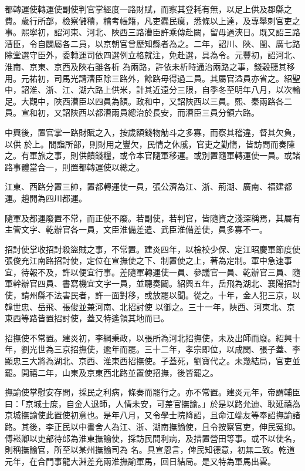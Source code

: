 \begin{pinyinscope}
 都轉運使轉運使副使判官掌經度一路財賦，而察其登耗有無，以足上供及郡縣之費。歲行所部，檢察儲積，稽考帳籍，凡吏蠹民瘼，悉條以上達，及專舉刺官吏之事。熙寧初，詔河東、河北、陜西三路漕臣許乘傳赴闕，留毋過浹日。既又詔三路漕臣，令自闢屬各二員，以京朝官曾歷知縣者為之。二年，詔川、陜、閩、廣七路除堂選守臣外，委轉運司依四選例立格就注，免赴選，具為令。元豐初，詔河北、淮南、京東、京西及陜右雖各析
 為兩路，許依未析時通治兩路之事，錢穀聽其移用。元祐初，司馬光請漕臣除三路外，餘路毋得過二員。其屬官溢員亦省之。紹聖中，詔淮、浙、江、湖六路上供米，計其近遠分三限，自季冬至明年八月，以次輸足。大觀中，陜西漕臣以四員為額。政和中，又詔陜西以三員。熙、秦兩路各二員。宣和初，又詔陜西以都漕兩員總治於長安，而漕臣三員分領六路。



 中興後，置官掌一路財賦之入，按歲額錢物觔斗之多寡，而察其稽違，督其欠負，以供
 於上。間詣所部，則財用之豐欠，民情之休戚，官吏之勤惰，皆訪問而奏陳之。有軍旅之事，則供饋錢糧，或令本官隨軍移運。或別置隨軍轉運使一員。或諸路事體當合一，則置都轉運使以總之。



 江東、西路分置三帥，置都轉運使一員，張公濟為江、浙、荊湖、廣南、福建都運。趙開為四川都運。



 隨軍及都運廢置不常，而正使不廢。若副使，若判官，皆隨資之淺深稱焉，其屬有主管文字、乾辦官各一員，文臣淮備差遣、武臣淮備差使，員多寡不一。



 招討使掌收招討殺盜賊之事，不常置。建炎四年，以檢校少保、定江昭慶軍節度使張俊充江南路招討使，定位在宣撫使之下、制置使之上，著為定制。軍中急速事宜，待報不及，許以便宜行事。差隨軍轉運使一員、參議官一員、乾辦官三員、隨軍幹辦官四員、書寫機宜文字一員，並聽奏闢。紹興五年，岳飛為湖北、襄陽招討使，請州縣不法害民者，許一面對移，或放罷以聞。從之。十年，金人犯三京，以韓世忠、岳飛、張俊並兼河南、北招討使
 以御之。三十一年，陜西、河東北、京東西等路皆置招討使，蓋又特遙領其地而已。



 招撫使不常置。建炎初，李綱秉政，以張所為河北招撫使，未及出師而廢。紹興十年，劉光世為三京招撫使，逾年而罷。三十二年，孝宗即位，以成閔、張子蓋、李顯忠三大將為湖北、京西、淮東西招撫使。子蓋死，劉寶代之。未幾結局，官吏並罷。開禧二年，山東及京東西北路並置使招撫，後皆罷之。



 撫諭使掌慰安存問，採民之利病，條奏而罷行之。亦不常置。建炎元年，帝謂輔臣曰：「京城士庶，自金人退師，人情未安，可差官撫諭。」於是以路允迪、耿延禧為京城撫諭使此置使初意也。是年八月，又令學士院降詔，且命江端友等奉詔撫諭諸路。其後，李正民以中書舍人為江、浙、湖南撫諭使，且令按察官吏，伸民冤抑。傅崧卿以吏部待郎為淮東撫諭使，採訪民間利病，及措置營田等事。或不以使名，則稱撫諭官，所至以某州撫諭司為
 名。具宣恩言，俾民知德意，初無二致。乾道元年，在合門事龍大淵差充兩淮撫諭軍馬，回日結局。是又特為軍馬出雲。




\end{pinyinscope}
